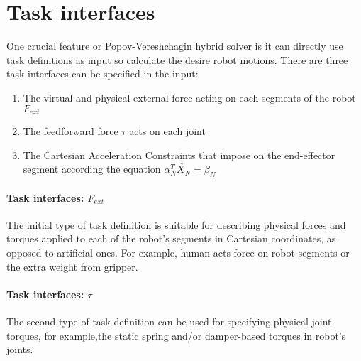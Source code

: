 \documentclass[report.tex]{subfiles}
\begin{document}
    \section{Task interfaces} \label{Task interfaces}
    One crucial feature or Popov-Vereshchagin hybrid solver is it can directly use task definitions as input so calculate the desire robot motions. There are three task interfaces can be specified in the input:
    \begin{enumerate}
        \item The virtual and physical external force acting on each segments of the robot $F_{ext}$
        \item The feedforward force $\tau$ acts on each joint 
        \item The Cartesian Acceleration Constraints that impose on the end-effector segment according the equation $\alpha_N^T \ddot{X_N} = \beta_N$
    \end{enumerate}
    \paragraph*{\large{Task interfaces: $F_{ext}$ }\\} The initial type of task definition is suitable for describing physical forces and torques applied to each of the robot's segments in Cartesian coordinates, as opposed to artificial ones. For example, human acts force on robot segments or the extra weight from gripper.
    \paragraph*{\large{Task interfaces: $\tau$}\\} The second type of task definition can be used for specifying physical joint torques, for example,the static spring and/or damper-based torques in robot's joints.
\end{document}
